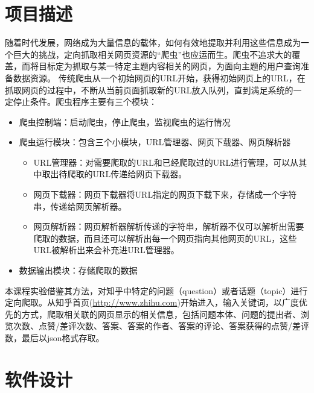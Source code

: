 \documentclass[UTF-8,a4paper, 12pt]{article}
\numberwithin{equation}{section}
\begin{document}
\section{项目描述}
随着时代发展，网络成为大量信息的载体，如何有效地提取并利用这些信息成为一个巨大的挑战，定向抓取相关网页资源的“爬虫”也应运而生。爬虫不追求大的覆盖，而将目标定为抓取与某一特定主题内容相关的网页，为面向主题的用户查询准备数据资源。
传统爬虫从一个初始网页的URL开始，获得初始网页上的URL，在抓取网页的过程中，不断从当前页面抓取新的URL放入队列，直到满足系统的一定停止条件。爬虫程序主要有三个模块：
\begin{itemize}
  \item 爬虫控制端：启动爬虫，停止爬虫，监视爬虫的运行情况
  \item 爬虫运行模块：包含三个小模块，URL管理器、网页下载器、网页解析器
  \begin{itemize}
    \item URL管理器：对需要爬取的URL和已经爬取过的URL进行管理，可以从其中取出待爬取的URL传递给网页下载器。
    \item 网页下载器：网页下载器将URL指定的网页下载下来，存储成一个字符串，传递给网页解析器。
    \item 网页解析器：网页解析器解析传递的字符串，解析器不仅可以解析出需要爬取的数据，而且还可以解析出每一个网页指向其他网页的URL，这些URL被解析出来会补充进URL管理器。
  \end{itemize}
  \item 数据输出模块：存储爬取的数据
\end{itemize}

本课程实验借鉴其方法，对知乎中特定的问题（question）或者话题（topic）进行定向爬取。从知乎首页(\url{http://www.zhihu.com})开始进入，输入关键词，以广度优先的方式，爬取相关联的网页显示的相关信息，包括问题本体、问题的提出者、浏览次数、点赞/差评次数、答案、答案的作者、答案的评论、答案获得的点赞/差评数，最后以json格式存取。

\section{软件设计}
\end{document}
